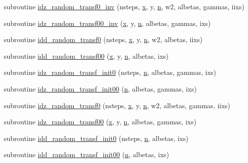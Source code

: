 \begin{DoxyCompactItemize}
\item 
subroutine \hyperlink{id__rtrans_8f_a4274f7dd6bde6e254960b41f1ff8c052}{idz\+\_\+random\+\_\+transf0\+\_\+inv} (nsteps, \hyperlink{vecnorm1_8cc_ac73eed9e41ec09d58f112f06c2d6cb63}{x}, y, \hyperlink{indexexpr_8h_ab427e2e2b4d6cec55fa088ea2a692ace}{n}, w2, albetas, gammas, iixs)
\item 
subroutine \hyperlink{id__rtrans_8f_aa206d46defdb0f1ed0711dc55d47c8d7}{idz\+\_\+random\+\_\+transf00\+\_\+inv} (\hyperlink{vecnorm1_8cc_ac73eed9e41ec09d58f112f06c2d6cb63}{x}, y, \hyperlink{indexexpr_8h_ab427e2e2b4d6cec55fa088ea2a692ace}{n}, albetas, gammas, ixs)
\item 
subroutine \hyperlink{id__rtrans_8f_a48df7b8ce3bfe9d7e32bba069e1f87f4}{idd\+\_\+random\+\_\+transf0} (nsteps, \hyperlink{vecnorm1_8cc_ac73eed9e41ec09d58f112f06c2d6cb63}{x}, y, \hyperlink{indexexpr_8h_ab427e2e2b4d6cec55fa088ea2a692ace}{n}, w2, albetas, iixs)
\item 
subroutine \hyperlink{id__rtrans_8f_a7a7221e730179515a4d6e1ce1eaf4bfc}{idd\+\_\+random\+\_\+transf00} (\hyperlink{vecnorm1_8cc_ac73eed9e41ec09d58f112f06c2d6cb63}{x}, y, \hyperlink{indexexpr_8h_ab427e2e2b4d6cec55fa088ea2a692ace}{n}, albetas, ixs)
\item 
subroutine \hyperlink{id__rtrans_8f_ac4325a757bbf5a8dd4421e02e3db1ace}{idz\+\_\+random\+\_\+transf\+\_\+init0} (nsteps, \hyperlink{indexexpr_8h_ab427e2e2b4d6cec55fa088ea2a692ace}{n}, albetas, gammas, ixs)
\item 
subroutine \hyperlink{id__rtrans_8f_a6d2ca76db2d2252be33184594a73d346}{idz\+\_\+random\+\_\+transf\+\_\+init00} (\hyperlink{indexexpr_8h_ab427e2e2b4d6cec55fa088ea2a692ace}{n}, albetas, gammas, ixs)
\item 
subroutine \hyperlink{id__rtrans_8f_aebef0414aaea1f87077a605779d9ceea}{idz\+\_\+random\+\_\+transf0} (nsteps, \hyperlink{vecnorm1_8cc_ac73eed9e41ec09d58f112f06c2d6cb63}{x}, y, \hyperlink{indexexpr_8h_ab427e2e2b4d6cec55fa088ea2a692ace}{n}, w2, albetas, gammas, iixs)
\item 
subroutine \hyperlink{id__rtrans_8f_a0644f72af404ef03a223a074bb0007aa}{idz\+\_\+random\+\_\+transf00} (\hyperlink{vecnorm1_8cc_ac73eed9e41ec09d58f112f06c2d6cb63}{x}, y, \hyperlink{indexexpr_8h_ab427e2e2b4d6cec55fa088ea2a692ace}{n}, albetas, gammas, ixs)
\item 
subroutine \hyperlink{id__rtrans_8f_a692964f933a1ef34eb05e0f8d7146aec}{idd\+\_\+random\+\_\+transf\+\_\+init0} (nsteps, \hyperlink{indexexpr_8h_ab427e2e2b4d6cec55fa088ea2a692ace}{n}, albetas, ixs)
\item 
subroutine \hyperlink{id__rtrans_8f_a99316ca8535b7006f8cbb2136fc9149e}{idd\+\_\+random\+\_\+transf\+\_\+init00} (\hyperlink{indexexpr_8h_ab427e2e2b4d6cec55fa088ea2a692ace}{n}, albetas, ixs)
\end{DoxyCompactItemize}


